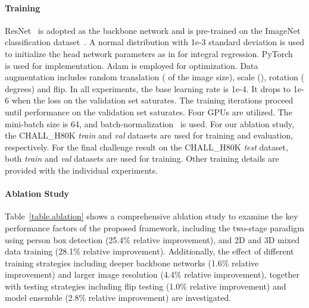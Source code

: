 \documentclass[runningheads]{llncs}
\begin{document}
\paragraph{\textbf{Training}} ResNet~\cite{he2016deep} is adopted as the backbone network and is pre-trained on the ImageNet classification dataset~\cite{deng2009imagenet}. A normal distribution with 1e-3 standard deviation is used to initialize the head network parameters as in \cite{sun2017integral} for integral regression. PyTorch~\cite{paszke2017automatic} is used for implementation. Adam is employed for optimization. Data augmentation includes random translation ( of the image size), scale (), rotation ( degrees) and flip. In all experiments, the base learning rate is 1e-4. It drops to 1e-6 when the loss on the validation set saturates. The training iterations proceed until performance on the validation set saturates. Four GPUs are utilized. The mini-batch size is 64, and batch-normalization~\cite{ioffe2015batch} is used. For our ablation study, the CHALL\_H80K \emph{train} and \emph{val} datasets are used for training and evaluation, respectively. For the final challenge result on the CHALL\_H80K \emph{test} dataset, both \emph{train} and \emph{val} datasets are used for training. Other training details are provided with the individual experiments.

\paragraph{\textbf{Ablation Study}} Table~\ref{table.ablation} shows a comprehensive ablation study to examine the key performance factors of the proposed framework, including the two-stage paradigm using person box detection (25.4\% relative improvement), and 2D and 3D mixed data training (28.1\% relative improvement). Additionally, the effect of different training strategies including deeper backbone networks (1.6\% relative improvement) and larger image resolution (4.4\% relative improvement), together with testing strategies including flip testing (1.0\% relative improvement) and model ensemble (2.8\% relative improvement) are investigated.
\end{document}
